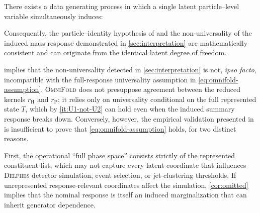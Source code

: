 \documentclass[12pt]{article}
\newcommand{\Herwig}{\mathrm{H}}
\newcommand{\Pythia}{\mathrm{P}}
\newcommand{\1}{\mathbbm{1}}
\newcommand{\pushf}[1]{#1_{\#}}
\renewcommand{\[}{\begin{equation}}
\renewcommand{\]}{\end{equation}}
\begin{document}
    \begin{proposition}
    \label{prop:compatible}
        There exists a data generating process in which a single latent particle--level variable simultaneously induces:
        Consequently, the particle--identity hypothesis of \textcite{Andreassen:2019cjw} and the non-universality of the induced mass response demonstrated in \cref{sec:interpretation} are mathematically consistent and can originate from the identical latent degree of freedom.
    \end{proposition}

     implies that the non-universality detected in \cref{sec:interpretation} is not, \textit{ipso facto}, incompatible with the full-response universality assumption in \cref{eq:omnifold-assumption}.
    \textsc{OmniFold} does not presuppose agreement between the reduced kernels \(r_\Herwig\) and \(r_\Pythia\); it relies only on universality conditional on the full represented state \(T\), which by \cref{it:U1-not-U2} can hold even when the induced summary response breaks down.
    Conversely, however, the empirical validation presented in \textcite{Andreassen:2019cjw} is insufficient to prove that \cref{eq:omnifold-assumption} holds, for two distinct reasons.

    First, the operational ``full phase space'' consists strictly of the represented constituent list, which may not capture every latent coordinate that influences \textsc{Delphes} detector simulation, event selection, or jet-clustering thresholds.
    If unrepresented response-relevant coordinates affect the simulation, \cref{cor:omitted} implies that the nominal response is itself an induced marginalization that can inherit generator dependence.
\end{document}
